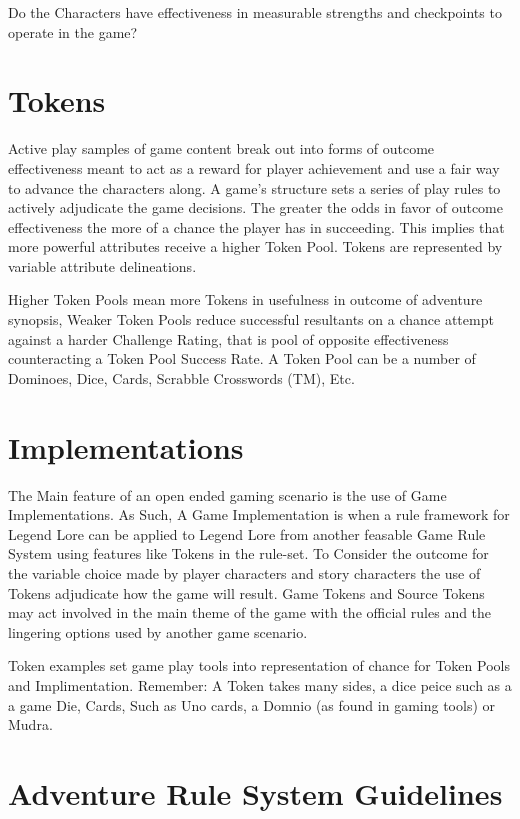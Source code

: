 \documentclass{article}
\begin{document}
Do the Characters have effectiveness in measurable strengths and checkpoints to operate  in the game?

\section{Tokens}

Active play samples of game content break out into forms of outcome effectiveness meant to act as a reward for player achievement and use a fair way to advance the characters along.  A game's structure sets a series of play rules to actively adjudicate the game decisions. The greater the odds in favor of outcome effectiveness the more of a chance the player has in succeeding. This implies that more powerful attributes receive a higher Token Pool. Tokens are represented by variable attribute delineations.

Higher Token Pools mean more Tokens in usefulness in outcome of adventure synopsis, Weaker Token Pools reduce successful resultants on a chance attempt against a harder Challenge Rating, that is pool of opposite effectiveness counteracting a Token Pool Success Rate. A Token Pool can be a number of Dominoes, Dice, Cards, Scrabble Crosswords (TM), Etc.

\section{Implementations}

The Main feature of an open ended gaming scenario is the use of Game Implementations. As Such, A Game Implementation is when a rule framework for Legend Lore can be applied to Legend Lore from another feasable Game Rule System using features like Tokens in the rule-set.  To Consider the outcome for the variable choice made by player characters and story characters the use of Tokens adjudicate how the game will result. Game Tokens and Source Tokens may act  involved in the main theme of the game with the official rules and the lingering options used by another game scenario.

Token examples set game play tools into representation of chance for Token Pools and Implimentation. Remember: A Token takes many sides, a dice peice such as a a game Die, Cards, Such as Uno cards, a Domnio (as found in gaming tools) or Mudra.

\section{Adventure Rule System Guidelines}
\end{document}
